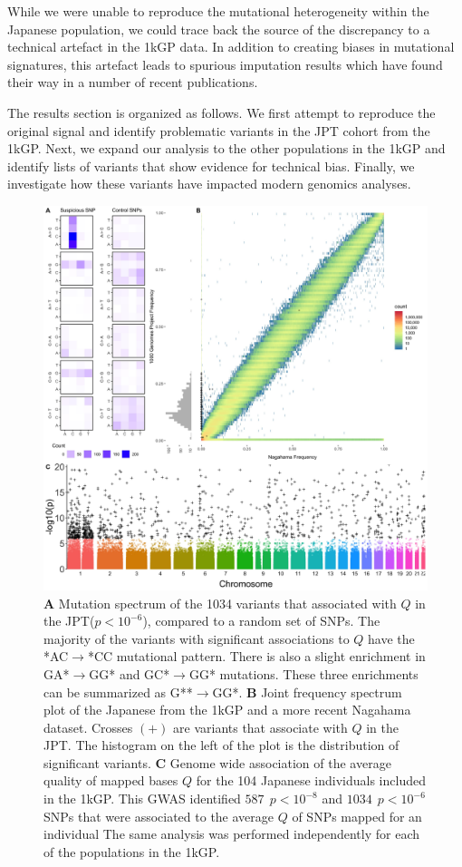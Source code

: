 \documentclass[9pt,lineno]{template}
\begin{document}
While we were unable to reproduce the mutational heterogeneity within the Japanese population, we could trace back the source of the discrepancy to a technical artefact in the 1kGP data.
In addition to creating biases in mutational signatures, this artefact leads to spurious imputation results which have found their way in a number of recent publications.


The results section is organized as follows.
We first attempt to reproduce the original signal and identify problematic variants in the JPT cohort from the 1kGP. 
Next, we expand our analysis to the other populations in the 1kGP and identify lists of variants that show evidence for technical bias.
Finally, we investigate how these variants have impacted modern genomics analyses.  
  

\begin{figure}
\includegraphics[width=\hsize,keepaspectratio]{../Figures/Figure1.jpg}
\caption{
\textbf{A} 
Mutation spectrum of the 1034 variants that associated with $Q$ in the JPT($p < 10^{-6}$), compared to a random set of SNPs.
The majority of the variants with significant associations to $Q$ have the *AC${\rightarrow}$*CC mutational pattern. 
There is also a slight enrichment in GA*${\rightarrow}$GG* and GC*${\rightarrow}$GG* mutations. 
These three enrichments can be summarized as G**${\rightarrow}$GG*. \textbf{B} 
Joint frequency spectrum plot of the Japanese from the 1kGP and a more recent Nagahama dataset.
Crosses $(+)$ are variants that associate with $Q$ in the JPT. 
The histogram on the left of the plot is the distribution of significant variants. 
\textbf{C} 
Genome wide association of the average quality of mapped bases $Q$ for the 104 Japanese individuals included in the 1kGP. This GWAS identified $587\ \  p < 10^{-8}$ and $1034\ \ p < 10^{-6}$ SNPs that were associated to the average $Q$ of SNPs mapped for an individual
The same analysis was performed independently for each of the populations in the 1kGP.}
 \label{SFS}
\end{figure}
\end{document}

